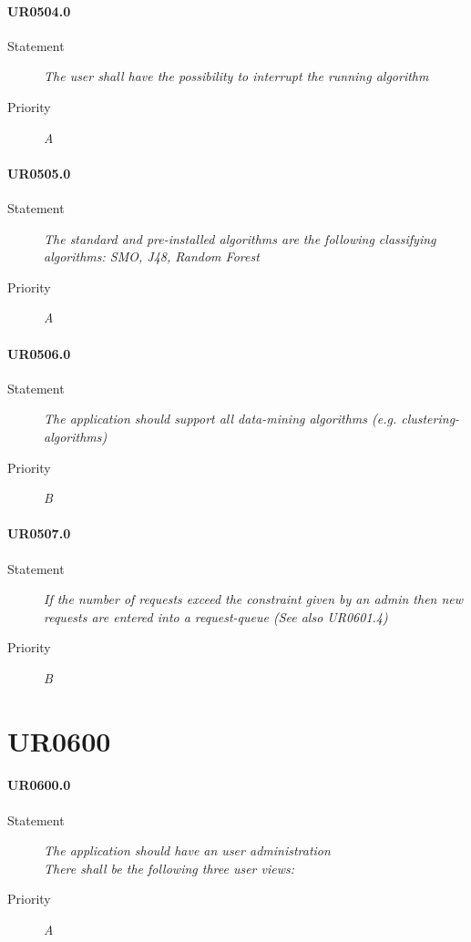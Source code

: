 \paragraph{UR0504.0}
\begin{description}
\item [Statement] \textit{
The user shall have the possibility to interrupt the running algorithm
}
\item [Priority] \textit{A}
\end{description}

\paragraph{UR0505.0}
\begin{description}
\item [Statement] \textit{
The standard and pre-installed algorithms are the following classifying algorithms: \gls{SMO}, \gls{J48}, \gls{Random Forest}
}
\item [Priority] \textit{A}
\end{description}

\paragraph{UR0506.0}
\begin{description}
\item [Statement] \textit{
The application should support all data-mining algorithms (e.g. clustering-algorithms)
}
\item [Priority] \textit{B}
\end{description}

\paragraph{UR0507.0}
\begin{description}
\item [Statement] \textit{
If the number of requests exceed the constraint given by an admin then new requests are entered into a request-queue (See also {UR0601.4}) 
}
\item [Priority] \textit{B}
\end{description}

\section{UR0600}

\paragraph{UR0600.0}
\begin{description}
\item [Statement] \textit{
The application should have an user administration
\\There shall be the following three user views:
}
\item [Priority] \textit{A}
\end{description}

